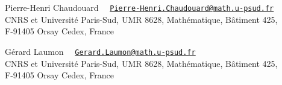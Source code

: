 \documentclass[12pt,a4paper,oneside,english,leqno]{smfart}
\numberwithin{theo}{subsection}
\begin{document}
\bigskip
\begin{flushleft}
Pierre-Henri Chaudouard \ \ \href{mailto:Pierre-Henri.Chaudouard@math.u-psud.fr}{\texttt{Pierre-Henri.Chaudouard@math.u-psud.fr}}\\
CNRS et Universit\'{e} Paris-Sud, UMR 8628, Math\'{e}matique, B\^{a}timent 425,\\
F-91405 Orsay Cedex, France
\bigskip

G\'{e}rard Laumon \ \ \href{mailto:Gerard.Laumon@math.u-psud.fr}{\texttt{Gerard.Laumon@math.u-psud.fr}}\\
CNRS et Universit\'{e} Paris-Sud, UMR 8628, Math\'{e}matique, B\^{a}timent 425,\\
F-91405 Orsay Cedex, France
\end{flushleft}
\end{document}
